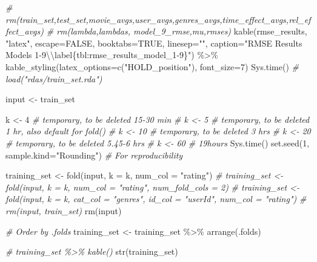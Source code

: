 \documentclass[
]{article}
\newenvironment{Shaded}{}{}
\newcommand{\AttributeTok}[1]{\textcolor[rgb]{0.49,0.56,0.16}{#1}}
\newcommand{\CommentTok}[1]{\textcolor[rgb]{0.38,0.63,0.69}{\textit{#1}}}
\newcommand{\ConstantTok}[1]{\textcolor[rgb]{0.53,0.00,0.00}{#1}}
\newcommand{\DecValTok}[1]{\textcolor[rgb]{0.25,0.63,0.44}{#1}}
\newcommand{\FunctionTok}[1]{\textcolor[rgb]{0.02,0.16,0.49}{#1}}
\newcommand{\NormalTok}[1]{#1}
\newcommand{\OtherTok}[1]{\textcolor[rgb]{0.00,0.44,0.13}{#1}}
\newcommand{\SpecialCharTok}[1]{\textcolor[rgb]{0.25,0.44,0.63}{#1}}
\newcommand{\StringTok}[1]{\textcolor[rgb]{0.25,0.44,0.63}{#1}}
\begin{document}
\begin{Shaded}
\begin{Highlighting}[]
\CommentTok{\# rm(train\_set,test\_set,movie\_avgs,user\_avgs,genres\_avgs,time\_effect\_avgs,rel\_effect\_avgs)}
\CommentTok{\# rm(lambda,lambdas, model\_9\_rmse,mu,rmses)}
  \FunctionTok{kable}\NormalTok{(rmse\_results, }\StringTok{"latex"}\NormalTok{, }\AttributeTok{escape=}\ConstantTok{FALSE}\NormalTok{, }\AttributeTok{booktabs=}\ConstantTok{TRUE}\NormalTok{, }\AttributeTok{linesep=}\StringTok{""}\NormalTok{, }\AttributeTok{caption=}\StringTok{"RMSE Results Models 1{-}9}\SpecialCharTok{\textbackslash{}\textbackslash{}}\StringTok{label\{tbl:rmse\_results\_model\_1{-}9\}"}\NormalTok{) }\SpecialCharTok{\%\textgreater{}\%}
    \FunctionTok{kable\_styling}\NormalTok{(}\AttributeTok{latex\_options=}\FunctionTok{c}\NormalTok{(}\StringTok{"HOLD\_position"}\NormalTok{), }\AttributeTok{font\_size=}\DecValTok{7}\NormalTok{)}
\FunctionTok{Sys.time}\NormalTok{()}
\CommentTok{\# load("rdas/train\_set.rda")}

\NormalTok{input }\OtherTok{\textless{}{-}}\NormalTok{ train\_set}

\NormalTok{k }\OtherTok{\textless{}{-}} \DecValTok{4} \CommentTok{\# temporary, to be deleted  15{-}30 min}
\CommentTok{\# k \textless{}{-} 5 \# temporary, to be deleted  1 hr, also default for fold()}
\CommentTok{\# k \textless{}{-} 10 \# temporary, to be deleted 3 hrs}
\CommentTok{\# k \textless{}{-} 20 \# temporary, to be deleted 5.45{-}6 hrs}
\CommentTok{\# k \textless{}{-} 60 \#                          19hours}
\FunctionTok{Sys.time}\NormalTok{()}
\FunctionTok{set.seed}\NormalTok{(}\DecValTok{1}\NormalTok{, }\AttributeTok{sample.kind=}\StringTok{"Rounding"}\NormalTok{) }\CommentTok{\# For reproducibility}

\NormalTok{training\_set }\OtherTok{\textless{}{-}} \FunctionTok{fold}\NormalTok{(input, }\AttributeTok{k =}\NormalTok{ k, }\AttributeTok{num\_col =} \StringTok{"rating"}\NormalTok{)}
\CommentTok{\# training\_set \textless{}{-} fold(input, k = k, num\_col = "rating", num\_fold\_cols = 2)}
\CommentTok{\# training\_set \textless{}{-} fold(input, k = k, cat\_col = "genres", id\_col = "userId", num\_col = "rating")}
\CommentTok{\# rm(input, train\_set)}
\FunctionTok{rm}\NormalTok{(input)}

\CommentTok{\# Order by .folds}
\NormalTok{training\_set }\OtherTok{\textless{}{-}}\NormalTok{ training\_set }\SpecialCharTok{\%\textgreater{}\%} \FunctionTok{arrange}\NormalTok{(.folds)}

\CommentTok{\# training\_set \%\textgreater{}\% kable()}
\FunctionTok{str}\NormalTok{(training\_set)}


\end{Highlighting}
\end{Shaded}
\end{document}
